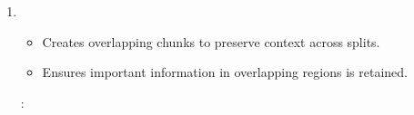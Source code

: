 \documentclass[letterpaper,11pt,english]{sphinxmanual}
\begin{document}
\begin{enumerate}
\sphinxAtStartPar
{}:
\begin{itemize}
\item {} 
\sphinxAtStartPar
Chunk 1: This is a sample document with multiple sentences to demonstrate

\item {} 
\sphinxAtStartPar
Chunk 2: fixed\sphinxhyphen{}length chunking.

\end{itemize}

\item {} 
\sphinxAtStartPar
{}
\begin{itemize}
\item {} 
\sphinxAtStartPar
Creates overlapping chunks to preserve context across splits.

\item {} 
\sphinxAtStartPar
Ensures important information in overlapping regions is retained.

\end{itemize}

\sphinxAtStartPar
{}:

\begin{sphinxVerbatim}[commandchars=\\\{\}]
   
      
      \PYG{p}{[}\PYG{p}{]}
           
          \PYG{p}{[}  \PYG{p}{]}
     


\end{sphinxVerbatim}
\end{enumerate}
\end{document}
